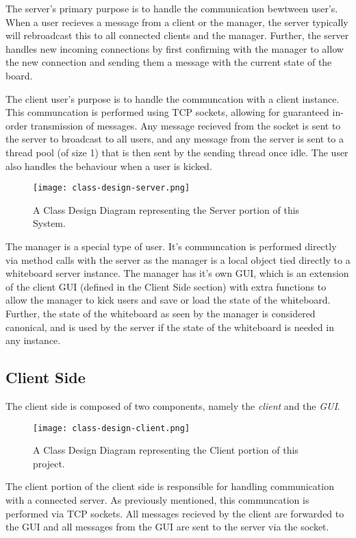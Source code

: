 \documentclass[12pt]{article}
\begin{document}
The server's primary purpose is to handle the communication bewtween user's. When a user recieves a message from a client or the manager, the server typically will rebroadcast this to all connected clients and the manager. Further, the server handles new incoming connections by first confirming with the manager to allow the new connection and sending them a message with the current state of the board.

The client user's purpose is to handle the communcation with a client instance. This communcation is performed using TCP sockets, allowing for guaranteed in-order transmission of messages. Any message recieved from the socket is sent to the server to broadcast to all users, and any message from the server is sent to a thread pool (of size 1) that is then sent by the sending thread once idle. The user also handles the behaviour when a user is kicked.

\begin{figure}[h]
  \centering
  \texttt{[image: class-design-server.png]}
  \caption{A Class Design Diagram representing the Server portion of this System.}
  \label{fig:server}
\end{figure}

The manager is a special type of user. It's communcation is performed directly via method calls with the server as the manager is a local object tied directly to a whiteboard server instance. The manager has it's own GUI, which is an extension of the client GUI (defined in the Client Side section) with extra functions to allow the manager to kick users and save or load the state of the whiteboard. Further, the state of the whiteboard as seen by the manager is considered canonical, and is used by the server if the state of the whiteboard is needed in any instance. 

\newpage

\subsection{Client Side}
The client side is composed of two components, namely the \textit{client} and the \textit{GUI}.

\begin{figure}[ht]
  \centering
  \texttt{[image: class-design-client.png]}
  \caption{A Class Design Diagram representing the Client portion of this project.}
  \label{fig:client}
\end{figure}

The client portion of the client side is responsible for handling communication with a connected server. As previously mentioned, this communcation is performed via TCP sockets. All messages recieved by the client are forwarded to the GUI and all messages from the GUI are sent to the server via the socket. 
\end{document}
